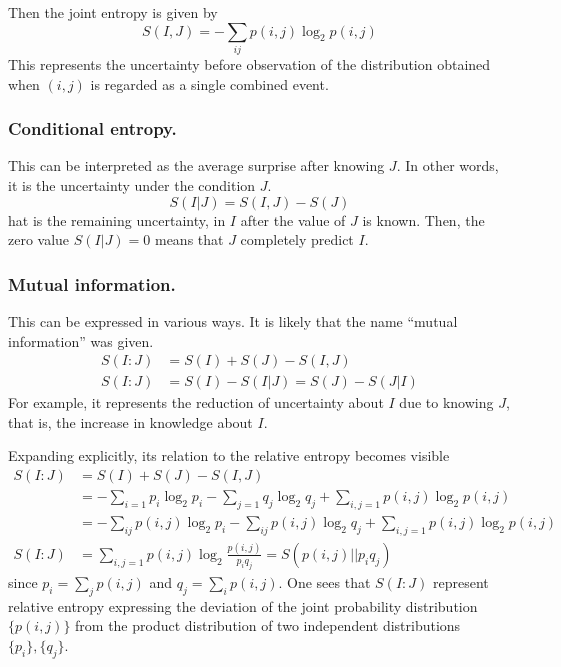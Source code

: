 \documentclass[../../../main.tex]{subfiles}
\begin{document}
Then the joint entropy is given by
\begin{equation*}
  S(I, J) = - \sum_{ij} p(i,j) \log_2 p(i,j)
\end{equation*}
This represents the uncertainty before observation of the distribution obtained when $(i,j)$ is regarded as a single combined event.

\subsubsection{Conditional entropy.}
This can be interpreted as the average surprise after knowing $J$. 
In other words, it is the uncertainty under the condition $J$.
\begin{equation*}
S(I|J) = S(I, J) - S(J)
\end{equation*}
hat is the remaining uncertainty, in $I$ after the value of $J$ is known.
Then, the zero value $S(I|J)=0$ means that $J$ completely predict $I$. 

\subsubsection{Mutual information.}
This can be expressed in various ways. 
It is likely that the name ``mutual information'' was given.
\begin{align*}
  S(I : J) &= S(I) + S(J) - S(I, J) \\
         S(I : J)&= S(I) - S(I|J) = S(J) - S(J|I)
\end{align*}
For example, it represents the reduction of uncertainty about $I$ due to knowing $J$, that is, the increase in knowledge about $I$. 

Expanding explicitly, its relation to the relative entropy becomes visible
\begin{align*}
  S(I : J) &= S(I) + S(J) - S(I, J) \\
&= - \sum_{i=1} p_i \log_2 p_i - \sum_{j=1} q_j \log_2 q_j + \sum_{i,j=1} p(i,j) \log_2 p(i,j) \\
&= - \sum_{ij} p(i,j) \log_2 p_i - \sum_{ij} p(i,j) \log_2 q_j + \sum_{i,j=1} p(i,j) \log_2 p(i,j) \\
S(I : J) 
&= \sum_{i,j=1} p(i,j) \log_2 \frac{p(i,j)}{p_i q_j}
= S(p(i,j)||p_iq_j)
\end{align*}
since $p_i = \sum_j p(i,j)$ and $q_j = \sum_i p(i,j)$.
One sees that $S(I:J)$ represent relative entropy expressing the deviation of the joint probability distribution $\{p(i,j)\}$ from the product distribution of two independent distributions $\{p_i\}, \{q_j\}$.
\end{document}
